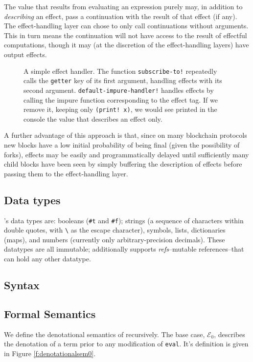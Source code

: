 The value that results from evaluating an expression purely may, in addition to
\emph{describing} an effect, pass a continuation with the result of that
effect (if any). The effect-handling layer can chose to only call continuations
without arguments. This in turn means the continuation will not have access to
the result of effectful computations, though it may (at the discretion of the
effect-handling layers) have output effects.

\begin{figure}[H]

    \caption{A simple effect handler. The function \texttt{subscribe-to!}
    repeatedly calls the \texttt{getter} key of its first argument, handling
    effects with its second argument. \texttt{default-impure-handler!} handles
    effects by calling the impure function corresponding to the effect tag. If
    we remove it, keeping only \texttt{(print! x)}, we would see printed in the
    console the value that describes an effect only.}
\label{f:eff-handler}
\end{figure}

A further advantage of this approach is that, since on many blockchain
protocols new blocks have a low initial probability of being final (given the
possibility of forks), effects may be easily and programmatically delayed until
sufficiently many child blocks have been seen by simply buffering the
description of effects before passing them to the effect-handling layer.

\subsection{Data types} \rad's data types are: booleans (\texttt{\#t} and
\texttt{\#f}); strings (a sequence of characters within double quotes, with
\texttt{\textbackslash} as the escape character), symbols, lists, dictionaries
(maps), and numbers (currently only arbitrary-precision decimals). These
datatypes are all immutable; additionally \rad supports \emph{refs}--mutable
references--that can hold any other datatype.

\subsection{Syntax}


\subsection{Formal Semantics} We define the denotational semantics of \rad
recursively. The base case, $\mathcal{E}_{0}$, describes the denotation of a
term prior to any modification of \texttt{eval}. It's definition is given in
Figure \ref{f:denotationalsem0}.

